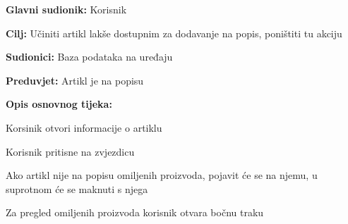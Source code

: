 				
				\noindent {}
				\begin{packed_item}
					\item \textbf{Glavni sudionik:} Korisnik
					\item  \textbf{Cilj:} Učiniti artikl lakše dostupnim za dodavanje na popis, poništiti tu akciju
					\item  \textbf{Sudionici:} Baza podataka na uređaju
					\item  \textbf{Preduvjet:} Artikl je na popisu
					\item  \textbf{Opis osnovnog tijeka:}
					\item[] \begin{packed_enum}
						\item Korsinik otvori informacije o  artiklu
						\item Korisnik pritisne na zvjezdicu
						\item Ako artikl nije na popisu omiljenih proizvoda, pojavit će se na njemu, u suprotnom će se maknuti s njega
						\item Za pregled omiljenih proizvoda korisnik otvara bočnu traku
					\end{packed_enum}
				\end{packed_item}
			
